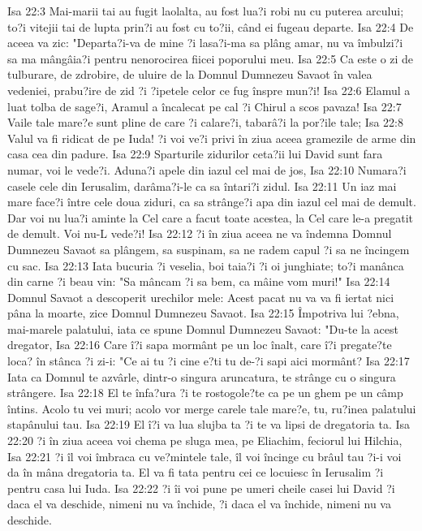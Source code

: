 Isa 22:3  Mai-marii tai au fugit laolalta, au fost lua?i robi nu cu puterea arcului; to?i vitejii tai de lupta prin?i au fost cu to?ii, când ei fugeau departe.
Isa 22:4  De aceea va zic: "Departa?i-va de mine ?i lasa?i-ma sa plâng amar, nu va îmbulzi?i sa ma mângâia?i pentru nenorocirea fiicei poporului meu.
Isa 22:5  Ca este o zi de tulburare, de zdrobire, de uluire de la Domnul Dumnezeu Savaot în valea vedeniei, prabu?ire de zid ?i ?ipetele celor ce fug înspre mun?i!
Isa 22:6  Elamul a luat tolba de sage?i, Aramul a încalecat pe cal ?i Chirul a scos pavaza!
Isa 22:7  Vaile tale mare?e sunt pline de care ?i calare?i, tabarâ?i la por?ile tale;
Isa 22:8  Valul va fi ridicat de pe Iuda! ?i voi ve?i privi în ziua aceea gramezile de arme din casa cea din padure.
Isa 22:9  Sparturile zidurilor ceta?ii lui David sunt fara numar, voi le vede?i. Aduna?i apele din iazul cel mai de jos,
Isa 22:10  Numara?i casele cele din Ierusalim, darâma?i-le ca sa întari?i zidul.
Isa 22:11  Un iaz mai mare face?i între cele doua ziduri, ca sa strânge?i apa din iazul cel mai de demult. Dar voi nu lua?i aminte la Cel care a facut toate acestea, la Cel care le-a pregatit de demult. Voi nu-L vede?i!
Isa 22:12  ?i în ziua aceea ne va îndemna Domnul Dumnezeu Savaot sa plângem, sa suspinam, sa ne radem capul ?i sa ne încingem cu sac.
Isa 22:13  Iata bucuria ?i veselia, boi taia?i ?i oi junghiate; to?i manânca din carne ?i beau vin: "Sa mâncam ?i sa bem, ca mâine vom muri!"
Isa 22:14  Domnul Savaot a descoperit urechilor mele: Acest pacat nu va va fi iertat nici pâna la moarte, zice Domnul Dumnezeu Savaot.
Isa 22:15  Împotriva lui ?ebna, mai-marele palatului, iata ce spune Domnul Dumnezeu Savaot: "Du-te la acest dregator,
Isa 22:16  Care î?i sapa mormânt pe un loc înalt, care î?i pregate?te loca? în stânca ?i zi-i: "Ce ai tu ?i cine e?ti tu de-?i sapi aici mormânt?
Isa 22:17  Iata ca Domnul te azvârle, dintr-o singura aruncatura, te strânge cu o singura strângere.
Isa 22:18  El te înfa?ura ?i te rostogole?te ca pe un ghem pe un câmp întins. Acolo tu vei muri; acolo vor merge carele tale mare?e, tu, ru?inea palatului stapânului tau.
Isa 22:19  El î?i va lua slujba ta ?i te va lipsi de dregatoria ta.
Isa 22:20  ?i în ziua aceea voi chema pe sluga mea, pe Eliachim, feciorul lui Hilchia,
Isa 22:21  ?i îl voi îmbraca cu ve?mintele tale, îl voi încinge cu brâul tau ?i-i voi da în mâna dregatoria ta. El va fi tata pentru cei ce locuiesc în Ierusalim ?i pentru casa lui Iuda.
Isa 22:22  ?i îi voi pune pe umeri cheile casei lui David ?i daca el va deschide, nimeni nu va închide, ?i daca el va închide, nimeni nu va deschide.

